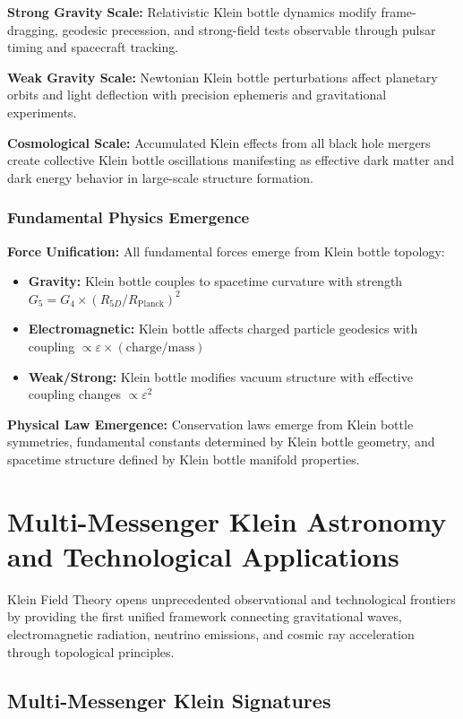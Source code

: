 \documentclass[12pt]{iopart}
\newcommand{\Rfive}{R_{5D}}
\begin{document}
\textbf{Strong Gravity Scale:} Relativistic Klein bottle dynamics modify frame-dragging, geodesic precession, and strong-field tests observable through pulsar timing and spacecraft tracking.

\textbf{Weak Gravity Scale:} Newtonian Klein bottle perturbations affect planetary orbits and light deflection with precision ephemeris and gravitational experiments.

\textbf{Cosmological Scale:} Accumulated Klein effects from all black hole mergers create collective Klein bottle oscillations manifesting as effective dark matter and dark energy behavior in large-scale structure formation.

\subsubsection{Fundamental Physics Emergence}

\textbf{Force Unification:} All fundamental forces emerge from Klein bottle topology:
\begin{itemize}
\item \textbf{Gravity:} Klein bottle couples to spacetime curvature with strength $G_5 = G_4 \times (\Rfive/R_{\text{Planck}})^2$
\item \textbf{Electromagnetic:} Klein bottle affects charged particle geodesics with coupling $\propto \varepsilon \times (\text{charge/mass})$
\item \textbf{Weak/Strong:} Klein bottle modifies vacuum structure with effective coupling changes $\propto \varepsilon^2$
\end{itemize}

\textbf{Physical Law Emergence:} Conservation laws emerge from Klein bottle symmetries, fundamental constants determined by Klein bottle geometry, and spacetime structure defined by Klein bottle manifold properties.

\section{Multi-Messenger Klein Astronomy and Technological Applications}

Klein Field Theory opens unprecedented observational and technological frontiers by providing the first unified framework connecting gravitational waves, electromagnetic radiation, neutrino emissions, and cosmic ray acceleration through topological principles.

\subsection{Multi-Messenger Klein Signatures}
\end{document}
